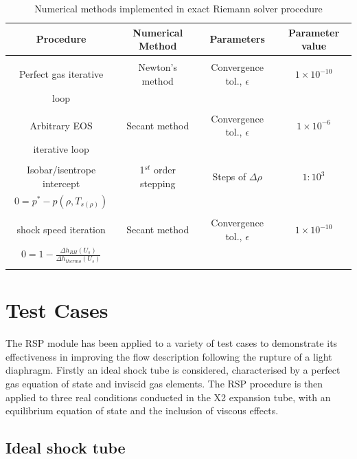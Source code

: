 \documentclass[a4paper,10pt]{article}
\begin{document}
\begin{table}[ht]
\begin{center}  %
\begin{tabular*}{1.0\textwidth}%
     {@{\extracolsep{\fill}}cccc}
\hline \hline \textbf{Procedure} & \textbf{Numerical Method} & \textbf{Parameters} & \textbf{Parameter value} \\
\hline
\\
Perfect gas iterative & Newton's method & Convergence tol., $\epsilon$ & $1 \times 10^{-10} $ \\
loop \\
\\
Arbitrary EOS & Secant method & Convergence tol., $\epsilon$ & $1 \times 10^{-6} $ \\
iterative loop \\
\\
Isobar/isentrope intercept & 1$^{st}$ order stepping & Steps of $ \Delta \rho $ & $1:10^{3}$ \\
$ 0 = p^{*} - p (\rho,T_{s(\rho)}) $
\\
\\
shock speed iteration & Secant method & Convergence tol., $\epsilon$ & $1 \times 10^{-10} $ \\
$0=1-\frac{ \Delta h_{RH}(U_{s})}{ \Delta h _{thermo}(U_{s})}$
\\
\\
\hline
\end{tabular*}
\caption{Numerical methods implemented in exact Riemann solver procedure} \label{table:numerical_methods}
\end{center}
\end{table}

\section{Test Cases}
\label{testcases}

The RSP module has been applied to a variety of test cases to demonstrate its effectiveness in improving the flow description following the rupture of a light diaphragm.  Firstly an ideal shock tube is considered, characterised by a perfect gas equation of state and inviscid gas elements.  The RSP procedure is then applied to three real conditions conducted in the X2 expansion tube, with an equilibrium equation of state and the inclusion of viscous effects.

\subsection{Ideal shock tube}
\end{document}
